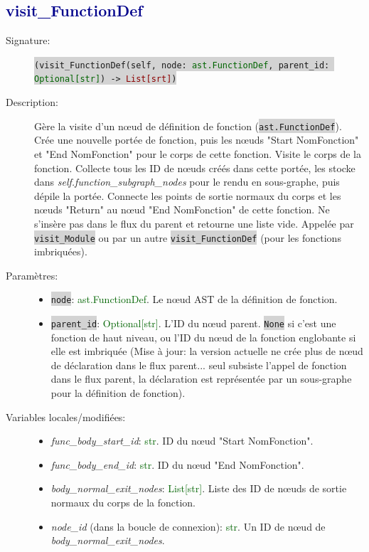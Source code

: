 \documentclass[11pt,a4paper]{article}
\newcommand{\code}[1]{\colorbox{lightgray}{\texttt{\small #1}}}
\newcommand{\var}[1]{\textit{#1}}
\newcommand{\vartype}[1]{\textcolor{darkgreen}{#1}}
\newcommand{\methodname}[1]{\textbf{\textcolor{darkblue}{#1}}}
\newcommand{\param}[1]{\code{#1}}
\newcommand{\rettype}[1]{\textcolor{darkred}{#1}}
\begin{document}
\subsection*{\methodname{visit\_FunctionDef}}
\begin{description}
    \item[Signature:] \code{(visit\_FunctionDef(self, node: \vartype{ast.FunctionDef}, parent\_id: \vartype{Optional[str]}) -> \rettype{List[srt]})}
    \item[Description:] Gère la visite d'un nœud de définition de fonction (\code{ast.FunctionDef}). Crée une nouvelle portée de fonction, puis les nœuds "Start NomFonction" et "End NomFonction" pour le corps de cette fonction. Visite le corps de la fonction. Collecte tous les ID de nœuds créés dans cette portée, les stocke dans \var{self.function\_subgraph\_nodes} pour le rendu en sous-graphe, puis dépile la portée. Connecte les points de sortie normaux du corps et les nœuds "Return" au nœud "End NomFonction" de cette fonction. Ne s'insère pas dans le flux du parent et retourne une liste vide. Appelée par \code{visit\_Module} ou par un autre \code{visit\_FunctionDef} (pour les fonctions imbriquées).
    \item[Paramètres:]
    \begin{itemize}
        \item \param{node}: \vartype{ast.FunctionDef}. Le nœud AST de la définition de fonction.
        \item \param{parent\_id}: \vartype{Optional[str]}. L'ID du nœud parent. \code{None} si c'est une fonction de haut niveau, ou l'ID du nœud de la fonction englobante si elle est imbriquée (Mise à jour: la version actuelle ne crée plus de nœud de déclaration dans le flux parent... seul subsiste l'appel de fonction dans le flux parent, la déclaration est représentée par un sous-graphe pour la définition de fonction).
    \end{itemize}
    \item[Variables locales/modifiées:]
    \begin{itemize}
        \item \var{func\_body\_start\_id}: \vartype{str}. ID du nœud "Start NomFonction".
        \item \var{func\_body\_end\_id}: \vartype{str}. ID du nœud "End NomFonction".
        \item \var{body\_normal\_exit\_nodes}: \vartype{List[str]}. Liste des ID de nœuds de sortie normaux du corps de la fonction.
        \item \var{node\_id} (dans la boucle de connexion): \vartype{str}. Un ID de nœud de \var{body\_normal\_exit\_nodes}.

\end{itemize}
\end{description}
\end{document}
